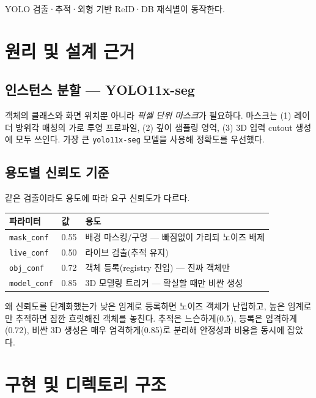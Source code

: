 \begin{statusdone}
YOLO 검출·추적·외형 기반 ReID·DB 재식별이 동작한다.
\end{statusdone}

\chapter{원리 및 설계 근거}

\section{인스턴스 분할 — YOLO11x-seg}
객체의 클래스와 화면 위치뿐 아니라 \emph{픽셀 단위 마스크}가 필요하다. 마스크는
(1) 레이더 방위각 매칭의 가로 투영 프로파일, (2) 깊이 샘플링 영역, (3) 3D 입력
cutout 생성에 모두 쓰인다. 가장 큰 \texttt{yolo11x-seg} 모델을 사용해 정확도를
우선했다.

\section{용도별 신뢰도 기준}
같은 검출이라도 용도에 따라 요구 신뢰도가 다르다.
\begin{center}
\begin{tabular}{@{}llp{6.5cm}@{}}
\toprule
파라미터 & 값 & 용도 \\
\midrule
\texttt{mask\_conf} & 0.55 & 배경 마스킹/구멍 — 빠짐없이 가리되 노이즈 배제 \\
\texttt{live\_conf} & 0.50 & 라이브 검출(추적 유지) \\
\texttt{obj\_conf}  & 0.72 & 객체 등록(registry 진입) — 진짜 객체만 \\
\texttt{model\_conf}& 0.85 & 3D 모델링 트리거 — 확실할 때만 비싼 생성 \\
\bottomrule
\end{tabular}
\end{center}

\begin{designbox}{왜 신뢰도를 단계화했는가}
낮은 임계로 등록하면 노이즈 객체가 난립하고, 높은 임계로만 추적하면 잠깐
흐릿해진 객체를 놓친다. 추적은 느슨하게(0.5), 등록은 엄격하게(0.72), 비싼 3D
생성은 매우 엄격하게(0.85)로 분리해 안정성과 비용을 동시에 잡았다.
\end{designbox}

\chapter{구현 및 디렉토리 구조}

